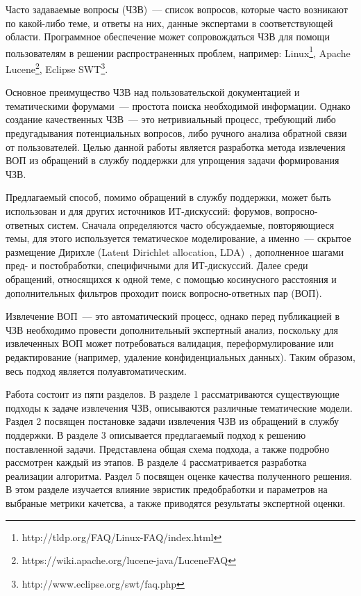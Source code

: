 \intro

Часто задаваемые вопросы (ЧЗВ)~--- список вопросов, которые часто возникают по какой-либо теме, и ответы на них, данные экспертами в соответствующей области. Программное обеспечение может сопровождаться ЧЗВ для помощи пользователям в решении распространенных проблем, например: Linux\footnote{http://tldp.org/FAQ/Linux-FAQ/index.html}, Apache Lucene\footnote{https://wiki.apache.org/lucene-java/LuceneFAQ}, Eclipse SWT\footnote{http://www.eclipse.org/swt/faq.php}.

Основное преимущество ЧЗВ над пользовательской документацией и тематическими форумами~--- простота поиска необходимой информации. Однако создание качественных ЧЗВ~--- это нетривиальный процесс, требующий либо предугадывания потенциальных вопросов, либо ручного анализа обратной связи от пользователей. Целью данной работы является разработка метода извлечения ВОП из обращений в службу поддержки для упрощения задачи формирования ЧЗВ.

Предлагаемый способ, помимо обращений в службу поддержки, может быть использован и для других источников ИТ-дискуссий: форумов, вопросно-ответных систем. Сначала определяются часто обсуждаемые, повторяющиеся темы, для этого используется тематическое моделирование, а именно~--- скрытое размещение Дирихле (Latent Dirichlet allocation, LDA)~\cite{LDA}, дополненное шагами пред- и постобработки, специфичными для ИТ-дискуссий. Далее среди обращений, относящихся к одной теме, с помощью косинусного расстояния и дополнительных фильтров проходит поиск вопросно-ответных пар (ВОП). 


Извлечение ВОП~--- это автоматический процесс, однако перед публикацией в ЧЗВ необходимо провести дополнительный экспертный анализ, поскольку для извлеченных ВОП может потребоваться валидация, переформулирование или редактирование (например, удаление конфиденциальных данных). Таким образом, весь подход является полуавтоматическим. 

Работа состоит из пяти разделов. В разделе 1 рассматриваются существующие подходы к задаче извлечения ЧЗВ, описываются различные тематические модели. Раздел 2 посвящен постановке задачи извлечения ЧЗВ из обращений в службу поддержки. В разделе 3 описывается предлагаемый подход к решению поставленной задачи. Представлена общая схема подхода, а также подробно рассмотрен каждый из этапов. В разделе 4 рассматривается разработка реализации алгоритма. Раздел 5 посвящен оценке качества полученного решения. В этом разделе изучается влияние эвристик предобработки и параметров на выбраные метрики качетсва, а также приводятся результаты экспертной оценки.